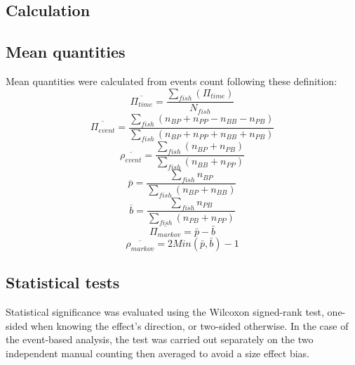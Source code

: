 \begin{appendices}
  \chapter{Calculation}
    \section{Mean quantities}
    Mean quantities were calculated from events count following these definition:
    \begin{equation}
      \overline{\Pi_{time}} = \frac{\sum_{fish}^{}(\Pi_{time})}{N_{fish}}
      \label{mean_pi_time}
    \end{equation}
    \begin{equation}
      \overline{\Pi_{event}} = \frac{\sum_{fish}^{}(n_{BP} + n_{PP} - n_{BB} - n_{PB})}{\sum_{fish}^{}(n_{BP} + n_{PP} + n_{BB} + n_{PB})}
      \label{mean_pi_event}
    \end{equation}
    \begin{equation}
      \overline{\rho_{event}} =\frac{\sum_{fish}^{}(n_{BP} + n_{PB})}{\sum_{fish}^{}(n_{BB} + n_{PP})}
      \label{mean_r_event}
    \end{equation}
    \begin{equation}
      \overline{p} = \frac{\sum_{fish}^{}n_{BP}}{\sum_{fish}^{}(n_{BP} + n_{BB})}
    \end{equation}
    \begin{equation}
      \overline{b} = \frac{\sum_{fish}^{}n_{PB}}{\sum_{fish}^{}(n_{PB} + n_{PP})}
    \end{equation}
    \begin{equation}
      \overline{\Pi_{markov}} = \bar{p} - \bar{b}
      \label{mean_pi_markov}
    \end{equation}
    \begin{equation}
      \overline{\rho_{markov}} = 2Min(\bar{p}, \bar{b}) - 1
      \label{mean_r_markov}
    \end{equation}

    \section{Statistical tests}
    Statistical significance was evaluated using the Wilcoxon signed-rank test, one-sided when knowing the effect's direction, or two-sided otherwise. In the case of the event-based analysis, the test was carried out separately on the two independent manual counting then averaged to avoid a size effect bias.


\end{appendices}
